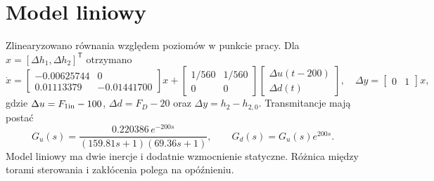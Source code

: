 \section{Model liniowy}
Zlinearyzowano równania względem poziomów w punkcie pracy. Dla $x=[\Delta h_1,\Delta h_2]^{\mathsf T}$ otrzymano
\begin{equation}
\dot x=
\begin{bmatrix}-\num{0.00625744}&0\\\num{0.01113379}&-\num{0.01441700}\end{bmatrix}x+
\begin{bmatrix}1/560&1/560\\0&0\end{bmatrix}
\begin{bmatrix}\Delta u(t-200)\\\Delta d(t)\end{bmatrix},\quad
\Delta y=\begin{bmatrix}0&1\end{bmatrix}x,
\end{equation}
gdzie $\Delta u=F_{1\mathrm{in}}-100$, $\Delta d=F_D-20$ oraz $\Delta y=h_2-h_{2,0}$. Transmitancje mają postać
\begin{equation}
G_u(s)=\frac{\num{0.220386}\,e^{-200s}}{(\num{159.81}s+1)(\num{69.36}s+1)},\qquad
G_d(s)=G_u(s)e^{200s}.
\end{equation}
Model liniowy ma dwie inercje i dodatnie wzmocnienie statyczne. Różnica między torami sterowania i zakłócenia polega na opóźnieniu.
